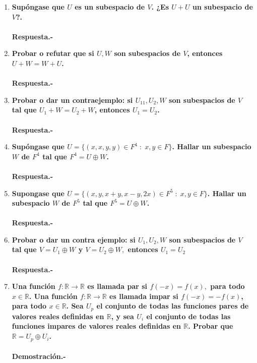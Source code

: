 \begin{multicols}{2}
\begin{enumerate}
    \item \textbf{\boldmath Supóngase que $U$ es un subespacio de $V$. ¿Es $U+U$ un subespacio de $V$?.}\\\\
	\textbf{Respuesta.-}\;

    \item \textbf{\boldmath Probar o refutar que si $U,W$ son subespacios de $V$, entonces $U+W=W+U$. }\\\\
	\textbf{Respuesta.-}\;

    \item \textbf{\boldmath Probar o dar un contraejemplo: si $U_11, U_2, W$ son subespacios de $V$ tal que $U_1+W = U_2+W$, entonces $U_1 = U_2$.}\\\\
	\textbf{Respuesta.-}\;

    \item \textbf{\boldmath Supóngase que $U=\lbrace (x,x,y,y)\in F^4\; : \; x,y \in F\rbrace$. Hallar un subespacio $W$ de $F^4$ tal que $F^4=U\oplus W$.}\\\\
	\textbf{Respuesta.-}\;

    \item \textbf{\boldmath Supongase que $U=\lbrace (x,y,x+y,x-y,2x)\in F^5\; : \; x,y\in F\rbrace$. Hallar un subespacio $W$ de $F^5$ tal que $F^5=U\oplus W$.}\\\\
	\textbf{Respuesta.-}\;

    \item \textbf{\boldmath Probar o dar un contra ejemplo: si $U_1,U_2,W$ son subespacios de $V$ tal que $V=U_1\oplus W$ y $V=U_2\oplus W,$ entonces $U_1=U_2$}\\\\
	\textbf{Respuesta.-}\;

    \item \textbf{\boldmath Una función $f:{\mathbb{R} \to \mathbb{R}}$ es llamada par si $f(-x)=f(x),$ para todo $x\in \mathbb{R}$. Una función $f:{\mathbb{R}\to \mathbb{R}}$ es llamada impar si $f(-x)=-f(x)$, para todo $x\in \mathbb{R}$. Sea $U_p$ el conjunto de todas las funciones pares de valores reales definidas en $\mathbb{R}$, y sea $U_i$ el conjunto de todas las funciones impares de valores reales definidas en $\mathbb{R}$. Probar que $\mathbb{R}=U_p \oplus U_i$.}\\\\
	\textbf{Demostración.-}\;






\end{enumerate}


\end{multicols}

